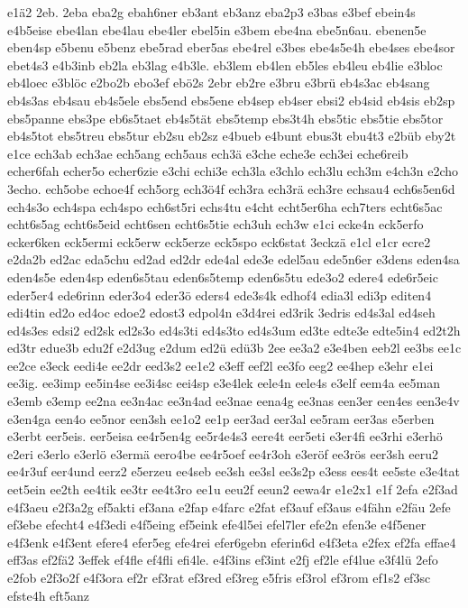 {e1ä2
2eb.
2eba
eba2g
ebah6ner
eb3ant
eb3anz
eba2p3
e3bas
e3bef
ebein4s
e4b5eise
ebe4lan
ebe4lau
ebe4ler
ebel5in
e3bem
ebe4na
ebe5n6au.
ebenen5e
eben4sp
e5benu
e5benz
ebe5rad
eber5as
ebe4rel
e3bes
ebe4s5e4h
ebe4ses
ebe4sor
ebet4s3
e4b3inb
eb2la
eb3lag
e4b3le.
eb3lem
eb4len
eb5les
eb4leu
eb4lie
e3bloc
eb4loec
e3blöc
e2bo2b
ebo3ef
ebö2s
2ebr
eb2re
e3bru
e3brü
eb4s3ac
eb4sang
eb4s3as
eb4sau
eb4s5ele
ebs5end
ebs5ene
eb4sep
eb4ser
ebsi2
eb4sid
eb4sis
eb2sp
ebs5panne
ebs3pe
eb6s5taet
eb4s5tät
ebs5temp
ebs3t4h
ebs5tic
ebs5tie
ebs5tor
eb4s5tot
ebs5treu
ebs5tur
eb2su
eb2sz
e4bueb
e4bunt
ebus3t
ebu4t3
e2büb
eby2t
e1ce
ech3ab
ech3ae
ech5ang
ech5aus
ech3ä
e3che
eche3e
ech3ei
eche6reib
echer6fah
echer5o
echer6zie
e3chi
echi3e
ech3la
e3chlo
ech3lu
ech3m
e4ch3n
e2cho
3echo.
ech5obe
echoe4f
ech5org
ech3ö4f
ech3ra
ech3rä
ech3re
echsau4
ech6s5en6d
ech4s3o
ech4spa
ech4spo
ech6st5ri
echs4tu
e4cht
echt5er6ha
ech7ters
echt6s5ac
echt6s5ag
echt6s5eid
echt6sen
echt6s5tie
ech3uh
ech3w
e1ci
ecke4n
eck5erfo
ecker6ken
eck5ermi
eck5erw
eck5erze
eck5spo
eck6stat
3eckzä
e1cl
e1cr
ecre2
e2da2b
ed2ac
eda5chu
ed2ad
ed2dr
ede4al
ede3e
edel5au
ede5n6er
e3dens
eden4sa
eden4s5e
eden4sp
eden6s5tau
eden6s5temp
eden6s5tu
ede3o2
edere4
ede6r5eic
eder5er4
ede6rinn
eder3o4
eder3ö
eders4
ede3s4k
edhof4
edia3l
edi3p
editen4
edi4tin
ed2o
ed4oc
edoe2
edost3
edpol4n
e3d4rei
ed3rik
3edris
ed4s3al
ed4seh
ed4s3es
edsi2
ed2sk
ed2s3o
ed4s3ti
ed4s3to
ed4s3um
ed3te
edte3e
edte5in4
ed2t2h
ed3tr
edue3b
edu2f
e2d3ug
e2dum
ed2ü
edü3b
2ee
ee3a2
e3e4ben
eeb2l
ee3bs
ee1c
ee2ce
e3eck
eedi4e
ee2dr
eed3s2
ee1e2
e3eff
eef2l
ee3fo
eeg2
ee4hep
e3ehr
e1ei
ee3ig.
ee3imp
ee5in4se
ee3i4sc
eei4sp
e3e4lek
eele4n
eele4s
e3elf
eem4a
ee5man
e3emb
e3emp
ee2na
ee3n4ac
ee3n4ad
ee3nae
eena4g
ee3nas
een3er
een4es
een3e4v
e3en4ga
een4o
ee5nor
een3sh
ee1o2
ee1p
eer3ad
eer3al
ee5ram
eer3as
e5erben
e3erbt
eer5eis.
eer5eisa
ee4r5en4g
ee5r4e4s3
eere4t
eer5eti
e3er4fi
ee3rhi
e3erhö
e2eri
e3erlo
e3erlö
e3ermä
eero4be
ee4r5oef
ee4r3oh
e3eröf
ee3rös
eer3sh
eeru2
ee4r3uf
eer4und
eerz2
e5erzeu
ee4seb
ee3sh
ee3sl
ee3s2p
e3ess
ees4t
ee5ste
e3e4tat
eet5ein
ee2th
ee4tik
ee3tr
ee4t3ro
ee1u
eeu2f
eeun2
eewa4r
e1e2x1
e1f
2efa
e2f3ad
e4f3aeu
e2f3a2g
ef5akti
ef3ana
e2fap
e4farc
e2fat
ef3auf
ef3aus
e4fähn
e2fäu
2efe
ef3ebe
efecht4
e4f3edi
e4f5eing
ef5eink
efe4l5ei
efel7ler
efe2n
efen3e
e4f5ener
e4f3enk
e4f3ent
efere4
efer5eg
efe4rei
efer6gebn
eferin6d
e4f3eta
e2fex
ef2fa
effae4
eff3as
ef2fä2
3effek
ef4fle
ef4fli
efi4le.
e4f3ins
ef3int
e2fj
ef2le
ef4lue
e3f4lü
2efo
e2fob
e2f3o2f
e4f3ora
ef2r
ef3rat
ef3red
ef3reg
e5fris
ef3rol
ef3rom
ef1s2
ef3sc
efste4h
eft5anz
}
